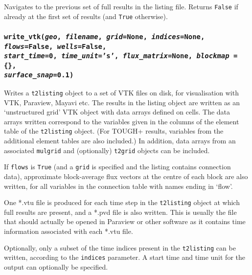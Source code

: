 Navigates to the previous set of full results in the listing file.  Returns \texttt{False} if already at the first set of results (and \texttt{True} otherwise).

\begin{snugshade}
\subsubsection{\texttt{write\_vtk(\emph{geo}, \emph{filename}, \emph{grid}=None, \emph{indices}=None, \emph{flows}=False,
\emph{wells}=False,\\
\emph{start\_time}=0, \emph{time\_unit}='s', \emph{flux\_matrix}=None, \emph{blockmap} = \{\},\\
 \emph{surface\_snap}=0.1)}}
\end{snugshade}
\label{sec:t2listing:write_vtk}

Writes a \texttt{t2listing} object to a set of VTK files on disk, for visualisation with VTK, Paraview, Mayavi etc.  The results in the listing object are written as an `unstructured grid' VTK object with data arrays defined on cells.  The data arrays written correspond to the variables given in the columns of the element table of the \texttt{t2listing} object.  (For TOUGH+ results, variables from the additional element tables are also included.) In addition, data arrays from an associated \texttt{mulgrid} and (optionally) \texttt{t2grid} objects can be included.

If \texttt{flows} is \texttt{True} (and a \texttt{grid} is specified and the listing contains connection data), approximate block-average flux vectors at the centre of each block are also written, for all variables in the connection table with names ending in `flow'.

One *.vtu file is produced for each time step in the \texttt{t2listing} object at which full results are present, and a *.pvd file is also written.  This is usually the file that should actually be opened in Paraview or other software as it contains time information associated with each *.vtu file.

Optionally, only a subset of the time indices present in the \texttt{t2listing} can be written, according to the \texttt{indices} parameter.  A start time and time unit for the output can optionally be specified.

